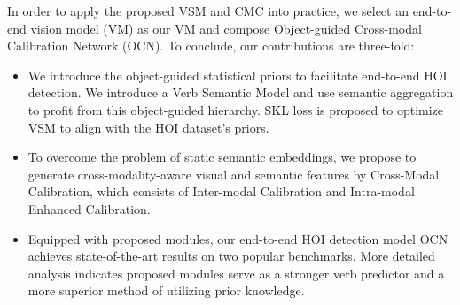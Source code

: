 \documentclass[letterpaper]{article} %
\begin{document}
In order to apply the proposed VSM and CMC into practice, we select an end-to-end vision model (VM) \cite{zou2021HOITransformer,tamura2021qpic} as our VM and compose Object-guided Cross-modal Calibration Network (OCN). To conclude, our contributions are three-fold:
\begin{itemize}
    \item We introduce the object-guided statistical priors to facilitate end-to-end HOI detection. We introduce a Verb Semantic Model and use semantic aggregation to profit from this object-guided hierarchy. SKL loss is proposed to optimize VSM to align with the HOI dataset’s priors.
    
    \item To overcome the problem of static semantic embeddings, we propose to generate cross-modality-aware visual and semantic features by Cross-Modal Calibration, which consists of Inter-modal Calibration and Intra-modal Enhanced Calibration.
    
    
    \item Equipped with proposed modules, our end-to-end HOI detection model OCN achieves state-of-the-art results on two popular benchmarks. More detailed analysis indicates proposed modules serve as a stronger verb predictor and a more superior method of utilizing prior knowledge.
    
    
    
\end{itemize}
\end{document}
